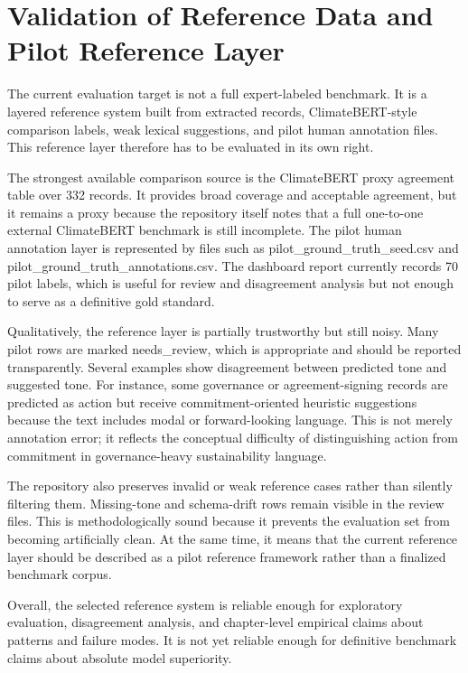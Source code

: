 \section{Validation of Reference Data and Pilot Reference Layer}

The current evaluation target is not a full expert-labeled benchmark. It is a layered reference system built from extracted records, ClimateBERT-style comparison labels, weak lexical suggestions, and pilot human annotation files. This reference layer therefore has to be evaluated in its own right.

The strongest available comparison source is the ClimateBERT proxy agreement table over 332 records. It provides broad coverage and acceptable agreement, but it remains a proxy because the repository itself notes that a full one-to-one external ClimateBERT benchmark is still incomplete. The pilot human annotation layer is represented by files such as pilot\_ground\_truth\_seed.csv and pilot\_ground\_truth\_annotations.csv. The dashboard report currently records 70 pilot labels, which is useful for review and disagreement analysis but not enough to serve as a definitive gold standard.

Qualitatively, the reference layer is partially trustworthy but still noisy. Many pilot rows are marked needs\_review, which is appropriate and should be reported transparently. Several examples show disagreement between predicted tone and suggested tone. For instance, some governance or agreement-signing records are predicted as action but receive commitment-oriented heuristic suggestions because the text includes modal or forward-looking language. This is not merely annotation error; it reflects the conceptual difficulty of distinguishing action from commitment in governance-heavy sustainability language.

The repository also preserves invalid or weak reference cases rather than silently filtering them. Missing-tone and schema-drift rows remain visible in the review files. This is methodologically sound because it prevents the evaluation set from becoming artificially clean. At the same time, it means that the current reference layer should be described as a pilot reference framework rather than a finalized benchmark corpus.

Overall, the selected reference system is reliable enough for exploratory evaluation, disagreement analysis, and chapter-level empirical claims about patterns and failure modes. It is not yet reliable enough for definitive benchmark claims about absolute model superiority.

